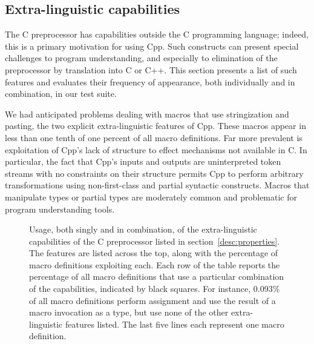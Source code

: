 \documentclass[10pt]{article}
\begin{document}




\subsection{Extra-linguistic capabilities}
\label{sec:extra-linguistic}

The C preprocessor has capabilities outside the C programming language;
indeed, this is a primary motivation for using Cpp.  Such constructs can
present special challenges to program understanding, and especially to
elimination of the preprocessor by translation into C or C++.  This section
presents a list of such features and evaluates their frequency of
appearance, both individually and in combination, in our test suite.

We had anticipated problems dealing with macros that use stringization and
pasting, the two explicit extra-linguistic features of Cpp.  These macros
appear in less than one tenth of one percent of all macro definitions.  Far
more prevalent is exploitation of Cpp's lack of structure to effect
mechanisms not available in C\@.  In particular, the fact that Cpp's inputs
and outputs are uninterpreted token streams with no constraints on their
structure permits Cpp to perform arbitrary transformations using
non-first-class and partial syntactic constructs.  Macros that manipulate
types or partial types are moderately common and problematic for program
understanding tools.

\begin{figure}
  {\small\centerline{}}
  
  \caption{Usage, both singly and in
    combination, of the extra-linguistic capabilities of the C
    preprocessor listed in section~\ref{desc:properties}.  The features are
    listed across the top, along with the percentage of macro definitions
    exploiting each.  Each row of the table reports the percentage of all
    macro definitions that use a particular combination of the
    capabilities, indicated by black squares.  For instance, 0.093\% of all
    macro definitions perform assignment and use the result of a macro
    invocation as a type, but use none of the other extra-linguistic
    features listed.  The last five lines each represent one macro
    definition.}
  \label{fig:subset-properties}
\end{figure}
\end{document}
